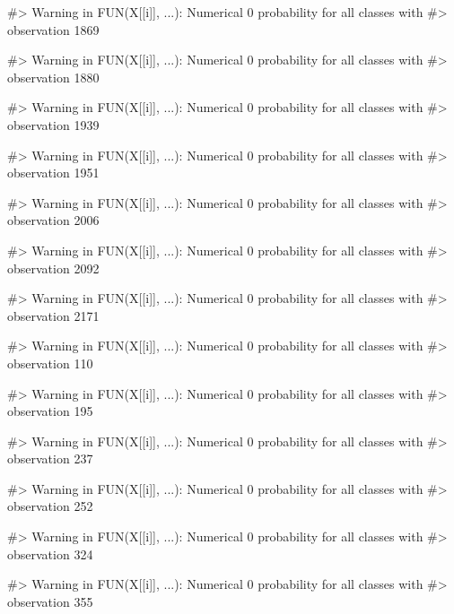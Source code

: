 \begin{Schunk}
\begin{Soutput}
#> Warning in FUN(X[[i]], ...): Numerical 0 probability for all classes with
#> observation 1869
\end{Soutput}
\begin{Soutput}
#> Warning in FUN(X[[i]], ...): Numerical 0 probability for all classes with
#> observation 1880
\end{Soutput}
\begin{Soutput}
#> Warning in FUN(X[[i]], ...): Numerical 0 probability for all classes with
#> observation 1939
\end{Soutput}
\begin{Soutput}
#> Warning in FUN(X[[i]], ...): Numerical 0 probability for all classes with
#> observation 1951
\end{Soutput}
\begin{Soutput}
#> Warning in FUN(X[[i]], ...): Numerical 0 probability for all classes with
#> observation 2006
\end{Soutput}
\begin{Soutput}
#> Warning in FUN(X[[i]], ...): Numerical 0 probability for all classes with
#> observation 2092
\end{Soutput}
\begin{Soutput}
#> Warning in FUN(X[[i]], ...): Numerical 0 probability for all classes with
#> observation 2171
\end{Soutput}
\begin{Soutput}
#> Warning in FUN(X[[i]], ...): Numerical 0 probability for all classes with
#> observation 110
\end{Soutput}
\begin{Soutput}
#> Warning in FUN(X[[i]], ...): Numerical 0 probability for all classes with
#> observation 195
\end{Soutput}
\begin{Soutput}
#> Warning in FUN(X[[i]], ...): Numerical 0 probability for all classes with
#> observation 237
\end{Soutput}
\begin{Soutput}
#> Warning in FUN(X[[i]], ...): Numerical 0 probability for all classes with
#> observation 252
\end{Soutput}
\begin{Soutput}
#> Warning in FUN(X[[i]], ...): Numerical 0 probability for all classes with
#> observation 324
\end{Soutput}
\begin{Soutput}
#> Warning in FUN(X[[i]], ...): Numerical 0 probability for all classes with
#> observation 355
\end{Soutput}

\end{Schunk}
